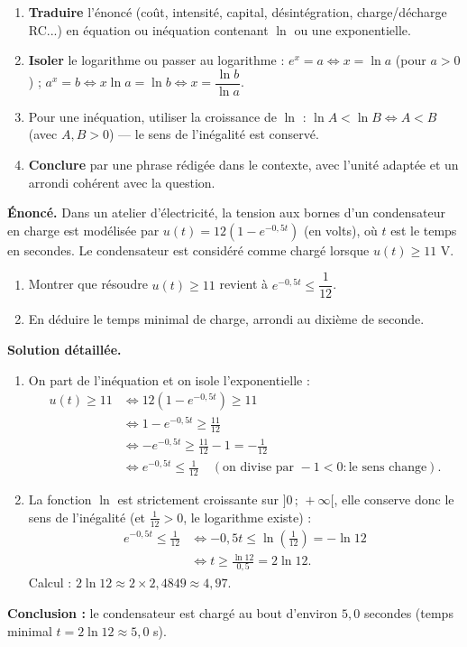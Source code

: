 \documentclass[11pt]{article}
\newcommand{\cle}[1]{{\popxbold\color{popdark}#1}}
\begin{document}
\begin{methode}
\begin{enumerate}
\item \textbf{Traduire} l'énoncé (coût, intensité, capital, désintégration, charge/décharge RC...) en équation ou inéquation contenant $\ln$ ou une exponentielle.
\item \textbf{Isoler} le logarithme ou passer au logarithme : $e^{x}=a \iff x=\ln a$ (pour $a>0$) ; $a^{x}=b \iff x\ln a = \ln b \iff x=\dfrac{\ln b}{\ln a}$.
\item Pour une inéquation, utiliser la \cle{croissance} de $\ln$ : $\ln A < \ln B \iff A<B$ (avec $A,B>0$) — le sens de l'inégalité est conservé.
\item \textbf{Conclure} par une phrase rédigée dans le contexte, avec l'unité adaptée et un arrondi cohérent avec la question.
\end{enumerate}
\end{methode}

\begin{exoresolu}
\textbf{Énoncé.} Dans un atelier d'électricité, la tension aux bornes d'un condensateur en charge est modélisée par $u(t)=12\left(1-e^{-0{,}5t}\right)$ (en volts), où $t$ est le temps en secondes. Le condensateur est considéré comme chargé lorsque $u(t)\geq 11$ V.
\begin{enumerate}
\item Montrer que résoudre $u(t)\geq 11$ revient à $e^{-0{,}5t}\leq \dfrac{1}{12}$.
\item En déduire le temps minimal de charge, arrondi au dixième de seconde.
\end{enumerate}
\tcblower
\textbf{Solution détaillée.}
\begin{enumerate}
\item On part de l'inéquation et on isole l'exponentielle :
\begin{align*}
u(t)\geq 11 &\iff 12\left(1-e^{-0{,}5t}\right)\geq 11 \\
&\iff 1-e^{-0{,}5t}\geq \frac{11}{12} \\
&\iff -e^{-0{,}5t}\geq \frac{11}{12}-1 = -\frac{1}{12} \\
&\iff e^{-0{,}5t}\leq \frac{1}{12} \quad (\text{on divise par } -1 < 0 : \text{le sens change}).
\end{align*}
\item La fonction $\ln$ est strictement croissante sur $]0\,;\,+\infty[$, elle conserve donc le sens de l'inégalité (et $\frac{1}{12}>0$, le logarithme existe) :
\begin{align*}
e^{-0{,}5t}\leq \frac{1}{12} &\iff -0{,}5t \leq \ln\!\left(\frac{1}{12}\right) = -\ln 12 \\
&\iff t \geq \frac{\ln 12}{0{,}5} = 2\ln 12.
\end{align*}
Calcul : $2\ln 12 \approx 2\times 2{,}4849 \approx 4{,}97$.
\end{enumerate}
\textbf{Conclusion :} le condensateur est chargé au bout d'environ $5{,}0$ secondes (temps minimal $t = 2\ln 12 \approx 5{,}0$ s).
\end{exoresolu}
\end{document}
